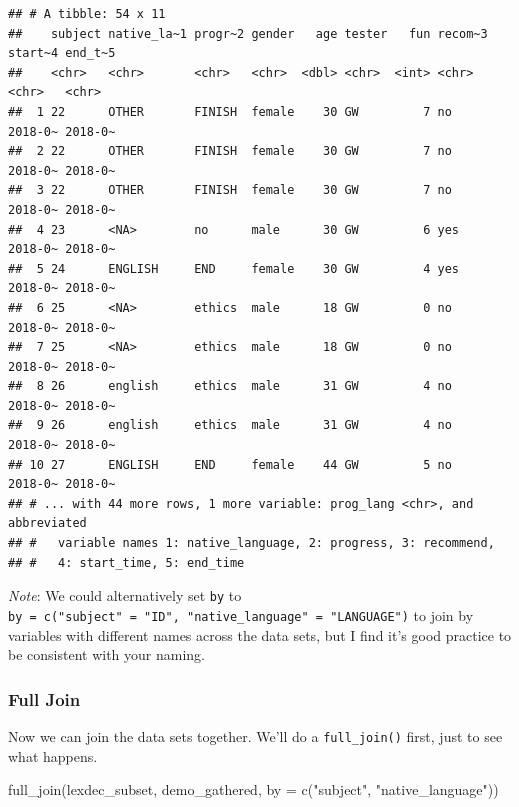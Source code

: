 \documentclass[
]{book}
\newenvironment{Shaded}{\begin{snugshade}}{\end{snugshade}}
\newcommand{\AttributeTok}[1]{\textcolor[rgb]{0.77,0.63,0.00}{#1}}
\newcommand{\FunctionTok}[1]{\textcolor[rgb]{0.00,0.00,0.00}{#1}}
\newcommand{\NormalTok}[1]{#1}
\newcommand{\StringTok}[1]{\textcolor[rgb]{0.31,0.60,0.02}{#1}}
\begin{document}
\begin{verbatim}
## # A tibble: 54 x 11
##    subject native_la~1 progr~2 gender   age tester   fun recom~3 start~4 end_t~5
##    <chr>   <chr>       <chr>   <chr>  <dbl> <chr>  <int> <chr>   <chr>   <chr>  
##  1 22      OTHER       FINISH  female    30 GW         7 no      2018-0~ 2018-0~
##  2 22      OTHER       FINISH  female    30 GW         7 no      2018-0~ 2018-0~
##  3 22      OTHER       FINISH  female    30 GW         7 no      2018-0~ 2018-0~
##  4 23      <NA>        no      male      30 GW         6 yes     2018-0~ 2018-0~
##  5 24      ENGLISH     END     female    30 GW         4 yes     2018-0~ 2018-0~
##  6 25      <NA>        ethics  male      18 GW         0 no      2018-0~ 2018-0~
##  7 25      <NA>        ethics  male      18 GW         0 no      2018-0~ 2018-0~
##  8 26      english     ethics  male      31 GW         4 no      2018-0~ 2018-0~
##  9 26      english     ethics  male      31 GW         4 no      2018-0~ 2018-0~
## 10 27      ENGLISH     END     female    44 GW         5 no      2018-0~ 2018-0~
## # ... with 44 more rows, 1 more variable: prog_lang <chr>, and abbreviated
## #   variable names 1: native_language, 2: progress, 3: recommend,
## #   4: start_time, 5: end_time
\end{verbatim}

\emph{Note}: We could alternatively set \texttt{by} to \texttt{by\ =\ c("subject"\ =\ "ID",\ "native\_language"\ =\ "LANGUAGE")} to join by variables with different names across the data sets, but I find it's good practice to be consistent with your naming.

\hypertarget{full-join}{%
\subsubsection{Full Join}\label{full-join}}

Now we can join the data sets together. We'll do a \texttt{full\_join()} first, just to see what happens.

\begin{Shaded}
\begin{Highlighting}[]
\FunctionTok{full\_join}\NormalTok{(lexdec\_subset, demo\_gathered, }\AttributeTok{by =} \FunctionTok{c}\NormalTok{(}\StringTok{"subject"}\NormalTok{, }\StringTok{"native\_language"}\NormalTok{))}
\end{Highlighting}
\end{Shaded}
\end{document}
